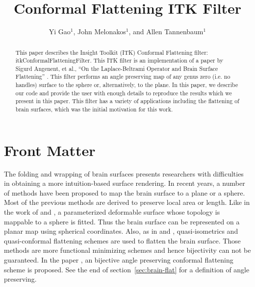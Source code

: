 \documentclass{InsightArticle}
\title{Conformal Flattening ITK Filter}
\author{Yi Gao$^{1}$, John Melonakos$^{1}$, and Allen Tannenbaum$^{1}$}
\begin{document}
	\newif\ifpdf
	\ifx\pdfoutput\undefined
  \pdffalse
	\else
  \pdftrue
	\fi


	\ifpdf
	\else
  \DeclareGraphicsExtensions{.eps,.jpg,.gif,.tiff,.bmp,.png}
  \DeclareGraphicsRule{.jpg}{eps}{.jpg.bb}{`convert #1 eps:-}
  \DeclareGraphicsRule{.gif}{eps}{.gif.bb}{`convert #1 eps:-}
  \DeclareGraphicsRule{.tiff}{eps}{.tiff.bb}{`convert #1 eps:-}
  \DeclareGraphicsRule{.bmp}{eps}{.bmp.bb}{`convert #1 eps:-}
  \DeclareGraphicsRule{.png}{eps}{.png.bb}{`convert #1 eps:-}
	\fi


	\maketitle


	\ifhtml
	\chapter*{Front Matter\label{front}}
	\fi


	\begin{abstract}
		\noindent This paper describes the Insight Toolkit (ITK) Conformal
		Flattening filter: itkConformalFlatteningFilter. This ITK filter
		is an implementation of a paper by Sigurd Angenent, et al., ``On
		the Laplace-Beltrami Operator and Brain Surface Flattening''
		\cite{angenent1999lbo}. This filter performs an angle preserving
		map of any genus zero (i.e. no handles) surface to the sphere or,
		alternatively, to the plane. In this paper, we describe our code
		and provide the user with enough details to reproduce the results
		which we present in this paper. This filter has a variety of
		applications including the flattening of brain surfaces, which was
		the initial motivation for this work.
	\end{abstract}

	\tableofcontents

	The folding and wrapping of brain surfaces presents researchers with
	difficulties in obtaining a more intuition-based surface
	rendering. In recent years, a number of methods have been proposed
	to map the brain surface to a plane or a sphere. Most of the
	previous methods are derived to preserve local area or length. Like
	in the work of \cite{davatzikos1996} and \cite{macDonald1994}, a
	parameterized deformable surface whose topology is mappable to a
	sphere is fitted. Thus the brain surface can be represented on a
	planar map using spherical coordinates. Also, as in
	\cite{carman1995} and \cite{schwartz1989}, quasi-isometrics and
	quasi-conformal flattening schemes are used to flatten the brain
	surface. Those methods are more functional minimizing schemes and
	hence bijectivity can not be guaranteed.  In the paper
	\cite{angenent1999lbo}, an bijective angle preserving conformal
	flattening scheme is proposed. See the end of
	section~\ref{sec:brain-flat} for a definition of angle preserving.
\end{document}
